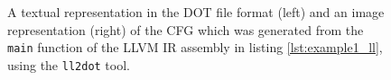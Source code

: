 \begin{figure}[htbp]
\begin{subfigure}[ht]{0.20\textwidth}
	\end{subfigure}
	\caption{A textual representation in the DOT file format (left) and an image representation (right) of the CFG which was generated from the \texttt{main} function of the LLVM IR assembly in listing \ref{lst:example1_ll}, using the \texttt{ll2dot} tool.}
	\label{fig:example1_cfg}
\end{figure}
